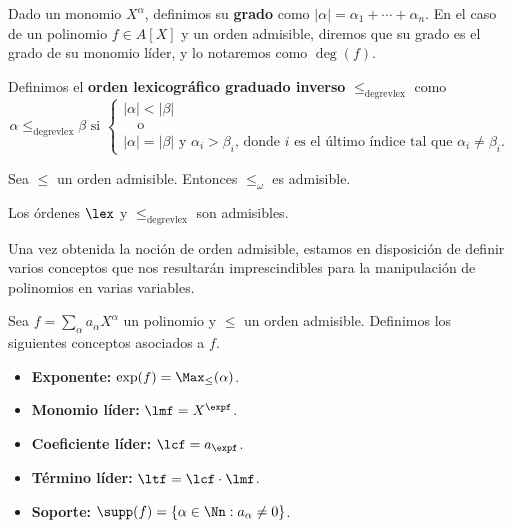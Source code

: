 \begin{definicion}
    Dado un monomio $X^{\alpha}$, definimos su \textbf{grado} como $\vert \alpha\vert = \alpha_1+\cdots + \alpha_n$. En el caso de un polinomio $f\in A[X]$ y un orden admisible, diremos que su grado es el grado de su monomio líder, y lo notaremos como $\deg(f)$.
\end{definicion}

\begin{definicion}
    Definimos el \textbf{orden lexicográfico graduado inverso} $\le_{\text{degrevlex}}$ como
    \begin{equation*}
        \alpha \le_{\text{degrevlex}} \beta \text{ si } \begin{cases}
            |\alpha| < |\beta| \\
            \quad\text{o}   \\
            |\alpha| = |\beta| \text{ y } \alpha_i > \beta_i \text{, donde $i$ es el último índice tal que } \alpha_i \neq \beta_i.
        \end{cases}
    \end{equation*}
\end{definicion}

\begin{proposicion}
    Sea $\le$ un orden admisible. Entonces $\le_{\omega}$ es admisible.
\end{proposicion}
\begin{proposicion}
    Los órdenes $\lex$ y $\le_{\text{degrevlex}}$ son admisibles.
\end{proposicion}

Una vez obtenida la noción de orden admisible, estamos en disposición de definir varios conceptos que nos resultarán imprescindibles para la manipulación de polinomios en varias variables.

\begin{definicion}
    Sea $f= \sum_{\alpha} a_{\alpha} X^{\alpha}$ un polinomio y $\le$ un orden admisible. Definimos los siguientes conceptos asociados a $f$.
    \begin{itemize}
        \item \textbf{Exponente:} $\exp(f) = \Max_{\le}(\alpha)$.
        \item \textbf{Monomio líder:}  $\lmf = X^{\expf}$.
        \item \textbf{Coeficiente líder:} $\lcf = a_{\expf}$.
        \item \textbf{Término líder:} $\ltf = \lcf \cdot \lmf$.
        \item \textbf{Soporte:} $\supp(f) =  \{ \alpha\in \Nn : a_{\alpha} \neq 0\}$.
    \end{itemize}
\end{definicion}

